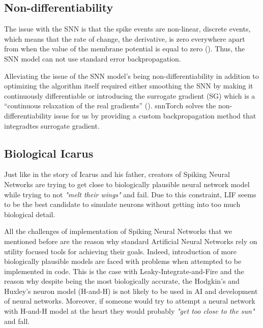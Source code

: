 \subsection{Non-differentiability}

The issue with the SNN is that the spike events are non-linear, discrete events, which means that the rate of change, the derivative, is zero everywhere apart from when the value of the membrane potential is equal to zero (). Thus, the SNN model can not use standard error backpropagation.

Alleviating the issue of the SNN model’s being non-differentiability in addition to optimizing the algorithm itself required either smoothing the SNN by making it continuously differentiable or introducing the surrogate gradient (SG) which is a “continuous relaxation of the real gradients” (). snnTorch solves the non-differentiability issue for us by providing a custom backpropagation method that integradtes surrogate gradient. 

\subsection{Biological Icarus}

Just like in the story of Icarus and his father, creators of Spiking Neural Networks are trying to get close to biologically plausible neural network model while trying to not \textit{"melt their wings"} and fail. Due to this constraint, LIF seems to be the best candidate to simulate neurons without getting into too much biological detail.

All the challenges of implementation of Spiking Neural Networks that we mentioned before are the reason why standard Artificial Neural Networks rely on utility focused tools for achieving their goals. Indeed, introduction of more biologically plausible models are faced with problems when attempted to be implemented in code. This is the case with Leaky-Integrate-and-Fire and the reason why despite being the most biologically accurate, the Hodgkin's and Huxley's neuron model (H-and-H) is not likely to be used in AI and development of neural networks. Moreover, if someone would try to attempt a neural network with H-and-H model at the heart they would probably \textit{"get too close to the sun"} and fall.